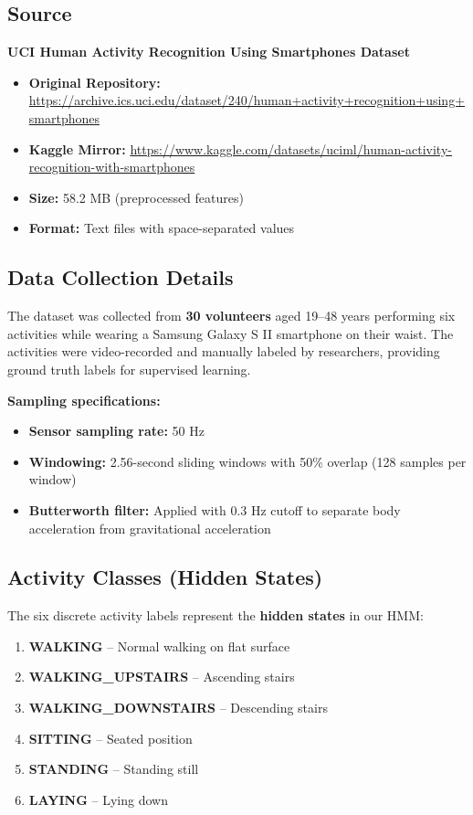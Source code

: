 \documentclass[11pt,a4paper]{article}
\begin{document}
\subsection{Source}

\textbf{UCI Human Activity Recognition Using Smartphones Dataset}

\begin{itemize}[leftmargin=*]
    \item \textbf{Original Repository:} \url{https://archive.ics.uci.edu/dataset/240/human+activity+recognition+using+smartphones}
    \item \textbf{Kaggle Mirror:} \url{https://www.kaggle.com/datasets/uciml/human-activity-recognition-with-smartphones}
    \item \textbf{Size:} 58.2 MB (preprocessed features)
    \item \textbf{Format:} Text files with space-separated values
\end{itemize}

\subsection{Data Collection Details}

The dataset was collected from \textbf{30 volunteers} aged 19--48 years performing six activities while wearing a Samsung Galaxy S II smartphone on their waist. The activities were video-recorded and manually labeled by researchers, providing ground truth labels for supervised learning.

\textbf{Sampling specifications:}
\begin{itemize}[leftmargin=*]
    \item \textbf{Sensor sampling rate:} 50 Hz
    \item \textbf{Windowing:} 2.56-second sliding windows with 50\% overlap (128 samples per window)
    \item \textbf{Butterworth filter:} Applied with 0.3 Hz cutoff to separate body acceleration from gravitational acceleration
\end{itemize}

\subsection{Activity Classes (Hidden States)}

The six discrete activity labels represent the \textbf{hidden states} in our HMM:

\begin{enumerate}
    \item \textbf{WALKING} -- Normal walking on flat surface
    \item \textbf{WALKING\_UPSTAIRS} -- Ascending stairs
    \item \textbf{WALKING\_DOWNSTAIRS} -- Descending stairs
    \item \textbf{SITTING} -- Seated position
    \item \textbf{STANDING} -- Standing still
    \item \textbf{LAYING} -- Lying down
\end{enumerate}
\end{document}
